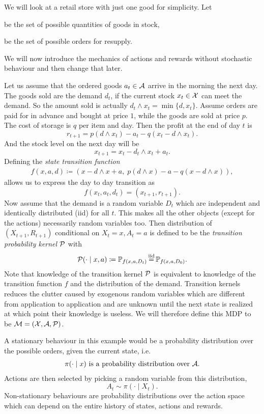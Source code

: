 \begin{example}\label{example: inventory mgmt} We will look at a retail store with just one good for simplicity. Let
	\begin{description}[noitemsep]
		\item[\(\cX\coloneqq\N\)] be the set of possible quantities of goods in stock,
		\item[\(\cA\coloneqq\N\)] be the set of possible orders for resupply.
	\end{description}
	We will now introduce the mechanics of actions and rewards without stochastic behaviour and then change that later.

	Let us assume that the ordered goods \(a_t\in\mathcal{A}\) arrive in the morning the next day. The goods sold are the demand \(d_t\), if the current stock \(x_t\in\mathcal{X}\) can meet the demand. So the amount sold is actually \(d_t\wedge x_t = \min\{d,x_t\}\). Assume orders are paid for in advance and bought at price \(1\), while the goods are sold at price \(p\). The cost of storage is \(q\) per item and day. Then the profit at the end of day \(t\) is
	\[
		r_{t+1}= p (d\wedge x_t)-a_t-q(x_t - d\wedge x_t).
	\]
	And the stock level on the next day will be
	\[
		x_{t+1}=x_t - d_t\wedge x_t + a_t.
	\]
	Defining the \emph{state transition function}
	\begin{align*}
		f(x,a,d)\coloneqq \left(x-d\wedge x + a,\; p(d\wedge x) - a - q(x - d\wedge x)\right),
	\end{align*}
	allows us to express the day to day transition as
	\[
		f(x_t,a_t,d_t)=(x_{t+1}, r_{t+1}).
	\]
	Now assume that the demand is a random variable \(D_t\) which are independent and identically distributed (iid) for all \(t\). This makes all the other objects (except for the actions) necessarily random variables too. Then distribution of \((X_{t+1},R_{t+1})\) conditional on \(X_t=x, A_t=a\) is defined to be the \emph{transition probability kernel} \(\mathcal{P}\) with
	\begin{align*}
		\cP(\cdot \mid x, a)\coloneqq\Pr_{f(x,a,D_t)}\xeq{\text{iid}} \Pr_{f(x,a,D_0)}.
	\end{align*}
	Note that knowledge of the transition kernel \(\mathcal{P}\) is equivalent to knowledge of the transition function \(f\) and the distribution of the demand. Transition kernels reduces the clutter caused by exogenous random variables which are different from application to application and are unknown until the next state is realized at which point their knowledge is useless. We will therefore define this MDP to be \(\mathcal{M}=(\mathcal{X},\mathcal{A},\mathcal{P})\).

	A stationary behaviour in this example would be a probability distribution over the possible orders, given the current state, i.e.
	\begin{align*}
		\pi(\cdot \mid x) \text{ is a probability distribution over }\mathcal{A}.
	\end{align*}
	Actions are then selected by picking a random variable from this distribution,
	\[
		A_t \sim \pi(\cdot \mid X_t).
	\]
	Non-stationary behaviours are probability distributions over the action space which can depend on the entire history of states, actions and rewards. 
\end{example}

